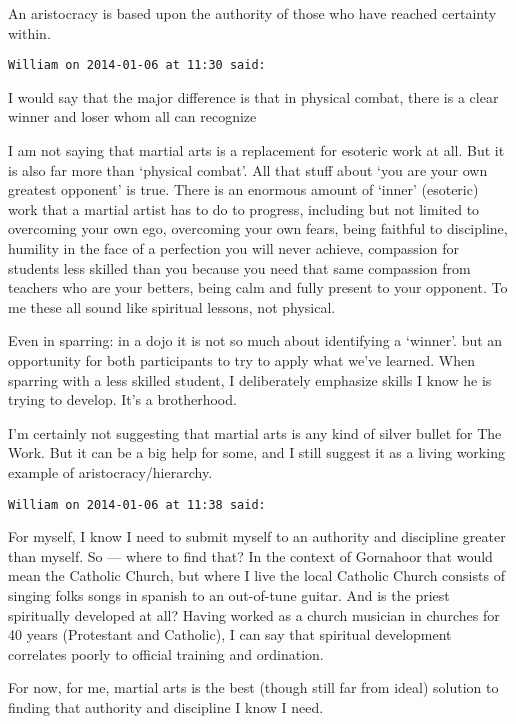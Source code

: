 \begin{footnotesize}
\begin{sffamily}
An aristocracy is based upon the authority of those who have reached certainty within.


\hfill

\texttt{William on 2014-01-06 at 11:30 said: }

I would say that the major difference is that in physical combat, there is a clear winner and loser whom all can recognize

I am not saying that martial arts is a replacement for esoteric work at all. But it is also far more than `physical combat'. All that stuff about `you are your own greatest opponent' is true. There is an enormous amount of `inner' (esoteric) work that a martial artist has to do to progress, including but not limited to overcoming your own ego, overcoming your own fears, being faithful to discipline, humility in the face of a perfection you will never achieve, compassion for students less skilled than you because you need that same compassion from teachers who are your betters, being calm and fully present to your opponent. To me these all sound like spiritual lessons, not physical.

Even in sparring: in a dojo it is not so much about identifying a `winner'. but an opportunity for both participants to try to apply what we've learned. When sparring with a less skilled student, I deliberately emphasize skills I know he is trying to develop. It's a brotherhood.

I'm certainly not suggesting that martial arts is any kind of silver bullet for The Work. But it can be a big help for some, and I still suggest it as a living working example of aristocracy/hierarchy.


\hfill

\texttt{William on 2014-01-06 at 11:38 said: }

For myself, I know I need to submit myself to an authority and discipline greater than myself. So — where to find that? In the context of Gornahoor that would mean the Catholic Church, but where I live the local Catholic Church consists of singing folks songs in spanish to an out-of-tune guitar. And is the priest spiritually developed at all? Having worked as a church musician in churches for 40 years (Protestant and Catholic), I can say that spiritual development correlates poorly to official training and ordination. 

For now, for me, martial arts is the best (though still far from ideal) solution to finding that authority and discipline I know I need.



\end{sffamily}
\end{footnotesize}
